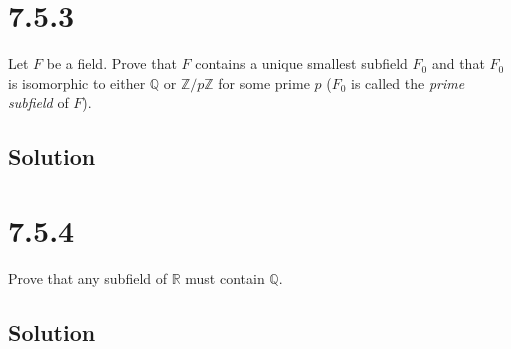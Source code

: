 \documentclass[fleqn]{article}
\begin{document}
    
    \section{7.5.3}
    Let $F$ be a field.  Prove that $F$ contains a unique smallest subfield $F_0$ and that $F_0$ is isomorphic to either $\mathbb{Q}$ or $\mathbb{Z}/p\mathbb{Z}$ for some prime $p$ ($F_0$ is called the \textit{prime subfield} of $F$).
        
        \subsection{Solution}
        
    
    \section{7.5.4}
    Prove that any subfield of $\mathbb{R}$ must contain $\mathbb{Q}$.
        
        \subsection{Solution}
        
    
\end{document}
